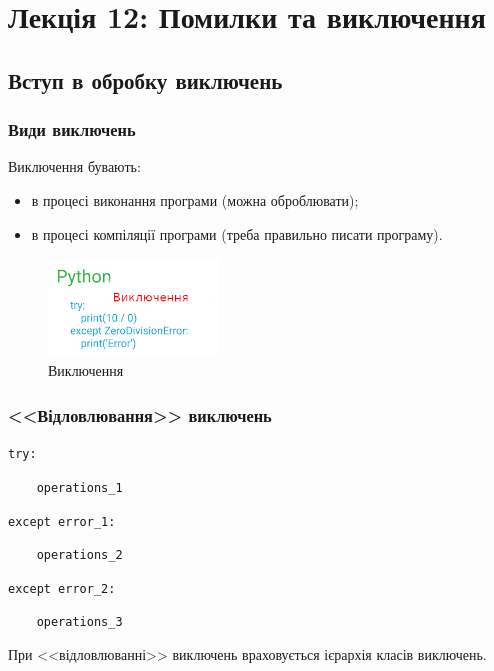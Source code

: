 \section*{Лекція 12: Помилки та виключення}
 
 \subsection{Вступ в обробку виключень} 
\begin{frame}
\frametitle{Види виключень}
Виключення бувають:
\begin{itemize}
  \item в процесі виконання програми (можна оброблювати);
  \item в процесі компіляції програми (треба правильно писати програму).
\end{itemize}
\begin{figure}
  \begin{center}
    \includegraphics[width=0.4\textwidth,height=0.4\textheight]{pictures/exceptions.png}
  \caption{Виключення}
\label{function}
  \end{center}
\end{figure}


\end{frame}

\begin{frame}
\frametitle{<<Відловлювання>> виключень}

\texttt{try:}

\texttt{~~~~operations\_1}

\texttt{except error\_1:}

\texttt{~~~~operations\_2}

\texttt{except error\_2:}

\texttt{~~~~operations\_3}

\vspace{0.5cm}
При <<відловлюванні>> виключень враховується ієрархія класів виключень.
\end{frame}

